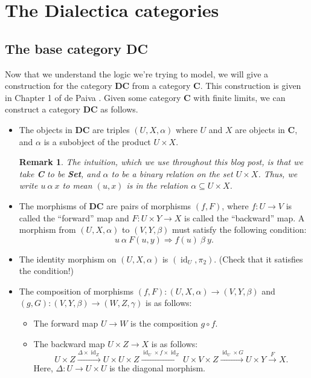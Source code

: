 \documentclass[a4paper]{article}
\newcommand{\DC}{\textbf{DC}}
\newcommand{\C}{\textbf{C}}
\DeclareMathOperator{\id}{id}
\newtheorem{remark}{Remark}
\begin{document}
\section{The Dialectica categories}
\subsection{The base category \DC}
Now that we understand the logic we're trying to model, we will give a construction for the category \DC{} from a category \C{}. This construction is given in Chapter 1 of de Paiva \cite{de1991dialectica}. Given some category \C{} with finite limits, we can construct a category \textbf{DC} as follows. 
\begin{itemize}
    \item The objects in \textbf{DC} are triples $(U, X,\alpha)$ where $U$ and $X$ are objects in \C{}, and $\alpha$ is a subobject of the product $U\times X$. 
    \begin{remark}
        The intuition, which we use throughout this blog post, is that we take \C{} to be \textbf{Set}, and $\alpha$ to be a \emph{binary relation} on the set $U\times X$. Thus, we write $u~\alpha~x$ to mean $(u,x)$ is in the relation $\alpha\subseteq U\times X$.
    \end{remark}
    \item The morphisms of \textbf{DC} are pairs of morphisms $(f, F)$, where $f:U\to V$ is called the ``forward'' map and $F:U\times Y\to X$ is called the ``backward'' map. A morphism from $(U,X,\alpha)$ to $(V,Y,\beta)$ must satisfy the following condition:
    \begin{equation*}
        u\ \alpha\ F(u,y)\Rightarrow f(u)\ \beta\ y.
    \end{equation*}
    \item The identity morphism on $(U,X,\alpha)$ is $(\id_U, \pi_2)$. (Check that it satisfies the condition!)
    \item The composition of morphisms $(f,F):(U,X,\alpha)\to (V,Y,\beta)$ and $(g,G):(V,Y,\beta)\to (W,Z,\gamma)$ is as follows:
    \begin{itemize}
        \item The forward map $U\to W$ is the composition $g\circ f$.
        \item The backward map $U\times Z\to X$ is as follows:
        \begin{equation*}
            U\times Z\xrightarrow{\Delta\times \id_Z}U\times U\times Z\xrightarrow{\id_U\times f\times \id_Z}U\times V\times Z\xrightarrow{\id_U\times G}U\times Y\xrightarrow{F}X.
        \end{equation*}
        Here, $\Delta:U\to U\times U$ is the diagonal morphism. 
    \end{itemize}
\end{itemize}
\end{document}
